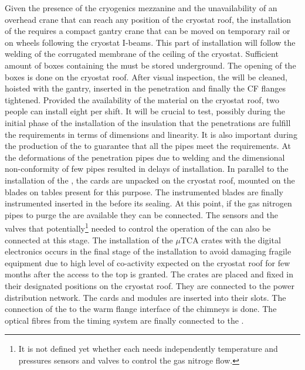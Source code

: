 Given the presence of the cryogenics mezzanine and the unavailability of an overhead crane that can reach any position of the cryostat roof, the installation of the  requires a compact gantry crane that can be moved on temporary rail or on wheels following the cryostat I-beams.
This part of installation will follow the welding of the corrugated membrane of the ceiling of the cryostat.
Sufficient amount of boxes containing the  must be stored underground.
The opening of the boxes is done on the cryostat roof.
After visual inspection, the  will be cleaned, hoisted with the gantry, inserted in the penetration and finally the CF flanges tightened.
Provided the availability of the material on the cryostat roof, two people can install eight  per shift. 
It will be crucial to test, possibly during the initial phase of the installation of the insulation that the penetrations are fulfill the requirements in terms of dimensions and linearity.
It is also important during the production of the  to guarantee that all the pipes meet the requirements.
At  the deformations of the penetration pipes due to welding and the dimensional non-conformity of few  pipes resulted in delays of installation.
In parallel to the installation of the , the  cards are unpacked on the cryostat roof, mounted on the blades on tables present for this purpose.
The instrumented blades are finally instrumented inserted in the  before its sealing.
At this point, if the gas nitrogen pipes to purge the  are available they can be connected.
The sensors and the valves that potentially\footnote{It is not defined yet whether each  needs independently temperature and pressures sensors and valves to control the gas nitroge flow.} needed to control the operation of the  can also be connected at this stage.
The installation of the $\mu$TCA crates with the digital electronics occurs in the final stage of the  installation to avoid damaging fragile equipment due to high level of co-activity expected on the cryostat roof for few months after the access to the top is granted.
The crates are placed and fixed in their designated positions on the cryostat roof.
They are connected to the power distribution network.
The  cards and  modules are inserted into their slots.
The connection of the   to the warm flange interface of the  chimneys is done.
The optical fibres from the timing system are finally connected to the .


